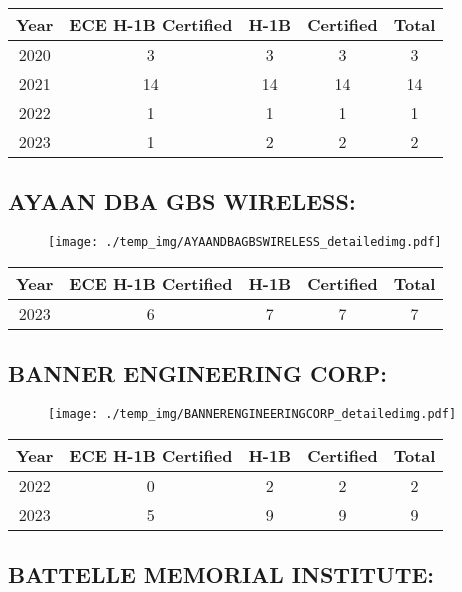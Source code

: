 \documentclass{article}%
\begin{document}
%
\begin{longtable}{c|c|c|c|c}%
\hline%
Year&ECE H{-}1B Certified&H{-}1B&Certified&Total\\%
\hline%
2020&3&3&3&3\\%
\hline%
2021&14&14&14&14\\%
\hline%
2022&1&1&1&1\\%
\hline%
2023&1&2&2&2\\%
\hline%
\end{longtable}

%
\newpage%
\subsection{AYAAN  DBA GBS WIRELESS:}%
\label{subsec:AYAANDBAGBSWIRELESS}%
\label{AYAANDBAGBSWIRELESSdetailed}%


\begin{figure}[htbp]%
\centering%
\texttt{[image: ./temp\_img/AYAANDBAGBSWIRELESS\_detailedimg.pdf]}%
\end{figure}

%
\begin{longtable}{c|c|c|c|c}%
\hline%
Year&ECE H{-}1B Certified&H{-}1B&Certified&Total\\%
\hline%
2023&6&7&7&7\\%
\hline%
\end{longtable}

%
\newpage%
\subsection{BANNER ENGINEERING CORP:}%
\label{subsec:BANNERENGINEERINGCORP}%
\label{BANNERENGINEERINGCORPdetailed}%


\begin{figure}[htbp]%
\centering%
\texttt{[image: ./temp\_img/BANNERENGINEERINGCORP\_detailedimg.pdf]}%
\end{figure}

%
\begin{longtable}{c|c|c|c|c}%
\hline%
Year&ECE H{-}1B Certified&H{-}1B&Certified&Total\\%
\hline%
2022&0&2&2&2\\%
\hline%
2023&5&9&9&9\\%
\hline%
\end{longtable}

%
\newpage%
\subsection{BATTELLE MEMORIAL INSTITUTE:}%
\label{subsec:BATTELLEMEMORIALINSTITUTE}%
\label{BATTELLEMEMORIALINSTITUTEdetailed}%
\end{document}
